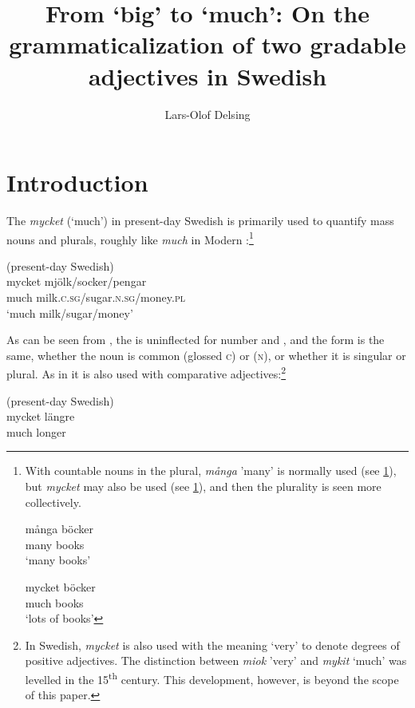 \documentclass[output=paper]{langscibook}
\author{Lars-Olof Delsing\affiliation{Lund University}}
\title[From ‘big’ to ‘much’]{From ‘big’ to ‘much’: On the grammaticalization of two gradable adjectives in Swedish}
\begin{document}
 \maketitle

\pagebreak\section{Introduction}\label{sec:delsing:1}\largerpage[2]


The  \textit{mycket} (‘much’) in present-day Swedish is primarily used to quantify mass nouns and plurals, roughly like \textit{much} in Modern :\footnote{With countable nouns in the plural, \textit{många} ’many’ is normally used (see \ref{ex:delsing:fni}), but \textit{mycket} may also be used (see \ref{ex:delsing:fnii}), and then the plurality is seen more collectively.

    \ea\label{ex:delsing:fni}
    \ea
    \gll många    böcker      \\
    many      books           \\
    \glt ‘many books’

    \ex\label{ex:delsing:fnii}
    \gll mycket   böcker\\
    much     books\\
    \glt  ‘lots of books’
    \z
    \z
}


\ea\label{ex:delsing:1}
(present-day Swedish)\\
\gll mycket  mjölk/socker/pengar\\
much      milk.\textsc{c}.\textsc{sg}/sugar.\textsc{n.sg}/money.\textsc{pl}\\
\glt `much milk/sugar/money'
\z

As can be seen from , the  is uninflected for number and , and the form is the same, whether the noun is common  (glossed \textsc{c}) or  (\textsc{n}), or whether it is singular or plural. As in  it is also used with comparative adjectives:\footnote{In Swedish, \textit{mycket} is also used with the meaning ‘very’ to denote degrees of positive adjectives. The  distinction between \textit{miok} ’very’ and \textit{mykit} ‘much’ was levelled in the 15\textsuperscript{th} century. This development, however, is beyond the scope of this paper.}


\ea\label{ex:delsing:2}
(present-day Swedish)\\
\gll mycket  längre\\
much      longer\\
\z
\end{document}
